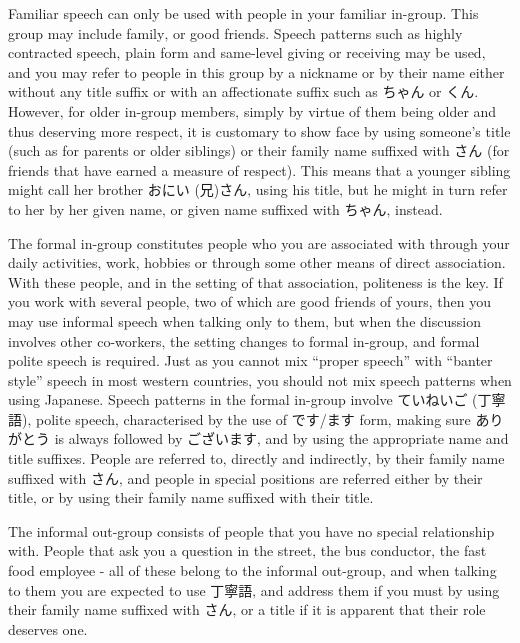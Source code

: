 \documentclass[11pt, b5paper, twoside, openright, onecolumn]{book}
\makeatletter
\newcommand*{\rubystack}[2]{{\relscale{0.5}%
  \begin{tabular}[b]{@{}c@{}}%
    {#1}\\%
   {\textscale{2}{#2}}%
  \end{tabular}}%
}
\DeclareRobustCommand*{\ruby}[2]{%
  \mbox{%
    \setlength{\parskip}{0ex}%
    \BeginAccSupp{method=pdfstringdef,ActualText={#1}}%
      \rubystack{\phantom{#2}}{#1}%
      \llap{%
        \rubystack{#2}{\phantom{#1}}%
      }%
    \EndAccSupp{}%
  }%
}
\renewcommand*{\ruby}[2]{#2 (#1)}%
\makeatother
\begin{document}
Familiar speech can only be used with people in your familiar in-group. This group may include family‚ or good friends. Speech patterns such as highly contracted speech‚ plain form and same-level giving or receiving may be used‚ and you may refer to people in this group by a nickname or by their name either without any title suffix or with an affectionate suffix such as ちゃん or くん. However‚ for older in-group members‚ simply by virtue of them being older and thus deserving more respect‚ it is customary to show face by using someone’s title (such as for parents or older siblings) or their family name suffixed with さん (for friends that have earned a measure of respect). This means that a younger sibling might call her brother お\ruby{兄}{にい}さん‚ using his title‚ but he might in turn refer to her by her given name‚ or given name suffixed with ちゃん‚ instead.

The formal in-group constitutes people who you are associated with through your daily activities‚ work‚ hobbies or through some other means of direct association. With these people‚ and in the setting of that association‚ politeness is the key. If you work with several people‚ two of which are good friends of yours‚ then you may use informal speech when talking only to them‚ but when the discussion involves other co-workers‚ the setting changes to formal in-group‚ and formal polite speech is required. Just as you cannot mix “proper speech” with “banter style” speech in most western countries‚ you should not mix speech patterns when using Japanese. Speech patterns in the formal in-group involve \ruby{丁寧語}{ていねいご}‚ polite speech‚ characterised by the use of です/ます form‚ making sure ありがとう is always followed by ございます‚ and by using the appropriate name and title suffixes. People are referred to‚ directly and indirectly‚ by their family name suffixed with さん‚ and people in special positions are referred either by their title‚ or by using their family name suffixed with their title.

The informal out-group consists of people that you have no special relationship with. People that ask you a question in the street‚ the bus conductor‚ the fast food employee - all of these belong to the informal out-group‚ and when talking to them you are expected to use 丁寧語‚ and address them if you must by using their family name suffixed with さん‚ or a title if it is apparent that their role deserves one.
\end{document}
